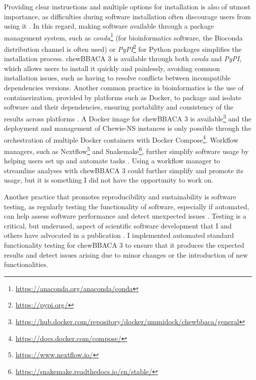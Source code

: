 Providing clear instructions and multiple options for installation is also of utmost importance, as difficulties during software installation often discourage users from using it \cite{alser_packaging_2024}. In this regard, making software available through a package management system, such as \textit{conda}\footnote{\url{https://anaconda.org/anaconda/conda}} (for bioinformatics software, the Bioconda distribution channel \cite{gruning_bioconda_2018} is often used) or \textit{PyPI}\footnote{\url{https://pypi.org/}} for Python packages simplifies the installation process. chewBBACA 3 is available through both \textit{conda} and \textit{PyPI}, which allows users to install it quickly and painlessly, avoiding common installation issues, such as having to resolve conflicts between incompatible dependencies versions. Another common practice in bioinformatics is the use of containerization, provided by platforms such as Docker, to package and isolate software and their dependencies, ensuring portability and consistency of the results across platforms \cite{gruening_recommendations_2018, nust_ten_2020, boettiger_introduction_2015, kadri_containers_2022}. A Docker image for chewBBACA 3 is available\footnote{\url{https://hub.docker.com/repository/docker/ummidock/chewbbaca/general}} and the deployment and management of \ac{Chewie-NS} instances is only possible through the orchestration of multiple Docker containers with Docker Compose\footnote{\url{https://docs.docker.com/compose/}}. Workflow managers, such as Nextflow\footnote{\url{https://www.nextflow.io/}} and Snakemake\footnote{\url{https://snakemake.readthedocs.io/en/stable/}}, further simplify software usage by helping users set up and automate tasks \cite{wratten_reproducible_2021, strozzi_scalable_2019}. Using a workflow manager to streamline analyses with chewBBACA 3 could further simplify and promote its usage, but it is something I did not have the opportunity to work on.

Another practice that promotes reproducibility and sustainability is software testing, as regularly testing the functionality of software, especially if automated, can help assess software performance and detect unexpected issues \cite{krafczyk_scientific_2019}. Testing is a critical, but underused, aspect of scientific software development that I and others have advocated in a publication \cite{van_der_putten_software_2022}. I implemented automated standard functionality testing for chewBBACA 3 to ensure that it produces the expected results and detect issues arising due to minor changes or the introduction of new functionalities.

